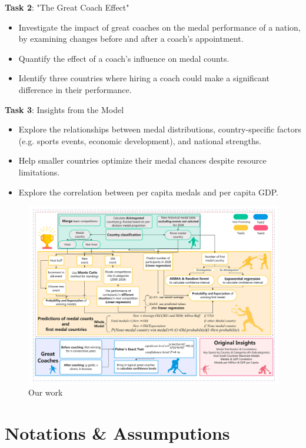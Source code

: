 \documentclass{mcmthesis}  %
\begin{document}
\textbf{Task 2}: "The Great Coach Effect"
\begin{itemize}
    \item Investigate the impact of great coaches on the medal performance of a nation, by examining changes before and after a coach’s appointment.
    \item Quantify the effect of a coach's influence on medal counts.
    \item Identify three countries where hiring a coach could make a significant difference in their performance.
\end{itemize}

\textbf{Task 3}: Insights from the Model
\begin{itemize}
    \item Explore the relationships between medal distributions, country-specific factors (e.g. sports events, economic development), and national strengths.
    \item Help smaller countries optimize their medal chances despite resource limitations.
    \item
    Explore the correlation between per capita medals and per capita GDP.
\end{itemize}

\begin{figure}[h!]
    \centering
    \includegraphics[width=1\textwidth]{image/流程图 新.jpg}  %
    \caption{Our work}
    \label{fig:sample-image}
\end{figure}

\section{Notations \& Assumputions}
\end{document}
